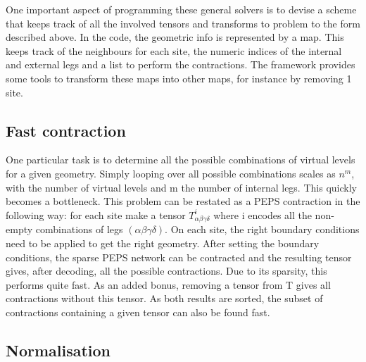 One important aspect of programming these general solvers is to devise a scheme that keeps track of all the involved tensors and transforms to problem to the form described above. In the code, the geometric info is represented by a map. This keeps track of the neighbours for each site, the numeric indices of the internal and external legs and a list to perform the contractions. The framework provides some tools to transform these maps into other maps, for instance by removing 1 site. 

\subsection{Fast contraction}

One particular task is to determine all the possible combinations of virtual levels for a given geometry. Simply looping over all possible combinations scales as $n^m$, with the number of virtual levels and m the number of internal legs. This quickly becomes a bottleneck.
This problem can be restated as a PEPS contraction in the following way: for each site make a tensor $ T^{i}_{  \alpha \beta \gamma \delta } $ where i encodes all the non-empty combinations of legs $(\alpha \beta \gamma \delta)$. On each site, the right boundary conditions need to be applied to get the right geometry. After setting the boundary conditions, the sparse PEPS network can be contracted and the resulting tensor gives, after decoding, all the possible contractions. Due to its sparsity, this performs quite fast.
As an added bonus, removing a tensor from T gives all contractions without this tensor. As both results are sorted, the subset of contractions containing a given tensor can also be found fast.

\subsection{Normalisation}\label{subsec:nf}

